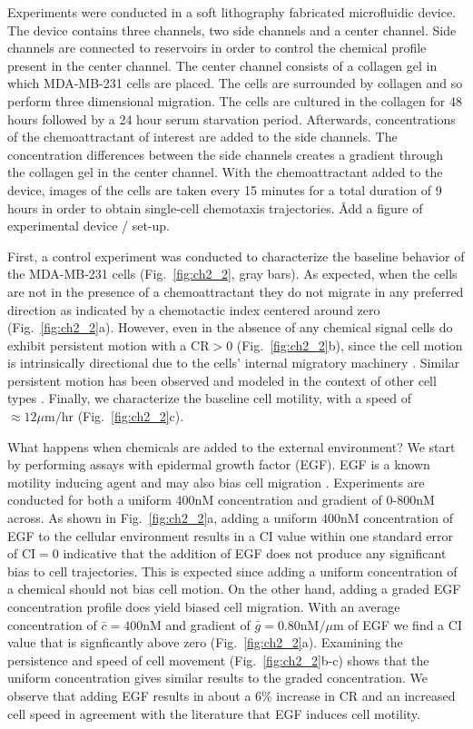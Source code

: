 Experiments were conducted in a soft lithography fabricated microfluidic device. The device contains three channels, two side channels and a center channel. Side channels are connected to reservoirs in order to control the chemical profile present in the center channel. The center channel consists of a collagen gel in which MDA-MB-231 cells are placed. The cells are surrounded by collagen and so perform three dimensional migration. The cells are cultured in the collagen for 48 hours followed by a 24 hour serum starvation period. Afterwards, concentrations of the chemoattractant of interest are added to the side channels. The concentration differences between the side channels creates a gradient through the collagen gel in the center channel. With the chemoattractant added to the device, images of the cells are taken every 15 minutes for a total duration of 9 hours in order to obtain single-cell chemotaxis trajectories. \r{Add a figure of experimental device / set-up.}

First, a control experiment was conducted to characterize the baseline behavior of the MDA-MB-231 cells (Fig.\ \ref{fig:ch2_2}, gray bars). As expected, when the cells are not in the presence of a chemoattractant they do not migrate in any preferred direction as indicated by a chemotactic index centered around zero (Fig.\ \ref{fig:ch2_2}a). However, even in the absence of any chemical signal cells do exhibit persistent motion with a $\text{CR} > 0$ (Fig.\ \ref{fig:ch2_2}b), since the cell motion is intrinsically directional due to the cells' internal migratory machinery \cite{petrie2009random}.
Similar persistent motion has been observed and modeled in the context of other cell types \cite{kim2013cooperative,codling2008random,othmer1988models}. Finally, we characterize the baseline cell motility, with a speed of $\approx 12 \mu\text{m/hr}$ (Fig.\ \ref{fig:ch2_2}c).

What happens when chemicals are added to the external environment? We start by performing assays with epidermal growth factor (EGF). EGF is a known motility inducing agent \cite{kim2013cooperative,mosadegh2008epidermal} and may also bias cell migration \cite{wang2004differential}. Experiments are conducted for both a uniform 400nM concentration and gradient of 0-800nM across.
As shown in Fig.\ \ref{fig:ch2_2}a, adding a uniform $400$nM concentration of EGF to the cellular environment results in a CI value within one standard error of $\text{CI} = 0$ indicative that the addition of EGF does not produce any significant bias to cell trajectories. This is expected since adding a uniform concentration of a chemical should not bias cell motion.
On the other hand, adding a graded EGF concentration profile does yield biased cell migration. With an average concentration of
$\bar{c}=400 \text{nM}$ and gradient of
$\bar{g}=0.80 \text{nM} / \mu\text{m}$
of EGF we find a CI value that is signficantly above zero (Fig.\ \ref{fig:ch2_2}a).
Examining the persistence and speed of cell movement (Fig.\ \ref{fig:ch2_2}b-c) shows that the uniform concentration gives similar results to the graded concentration. We observe that adding EGF results in about a 6\% increase in CR and an increased cell speed in agreement with the literature that EGF induces cell motility.

